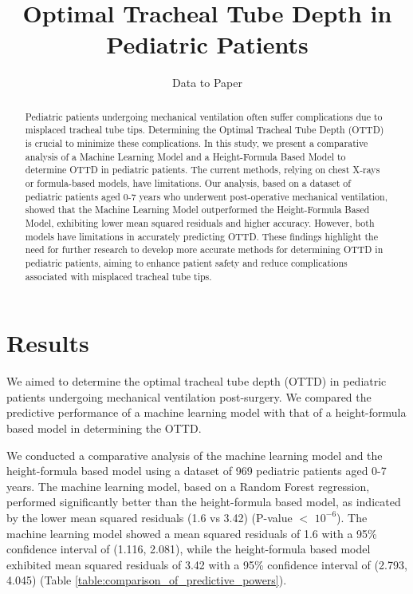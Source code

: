 \documentclass[11pt]{article}
\title{Optimal Tracheal Tube Depth in Pediatric Patients}
\author{Data to Paper}
\begin{document}
\maketitle
\begin{abstract}
Pediatric patients undergoing mechanical ventilation often suffer complications due to misplaced tracheal tube tips. Determining the Optimal Tracheal Tube Depth (OTTD) is crucial to minimize these complications. In this study, we present a comparative analysis of a Machine Learning Model and a Height-Formula Based Model to determine OTTD in pediatric patients. The current methods, relying on chest X-rays or formula-based models, have limitations. Our analysis, based on a dataset of pediatric patients aged 0-7 years who underwent post-operative mechanical ventilation, showed that the Machine Learning Model outperformed the Height-Formula Based Model, exhibiting lower mean squared residuals and higher accuracy. However, both models have limitations in accurately predicting OTTD. These findings highlight the need for further research to develop more accurate methods for determining OTTD in pediatric patients, aiming to enhance patient safety and reduce complications associated with misplaced tracheal tube tips.
\end{abstract}
\section*{Results}

We aimed to determine the optimal tracheal tube depth (OTTD) in pediatric patients undergoing mechanical ventilation post-surgery. We compared the predictive performance of a machine learning model with that of a height-formula based model in determining the OTTD.  

We conducted a comparative analysis of the machine learning model and the height-formula based model using a dataset of 969 pediatric patients aged 0-7 years. The machine learning model, based on a Random Forest regression, performed significantly better than the height-formula based model, as indicated by the lower mean squared residuals (1.6 vs 3.42) (P-value $<$ $10^{-6}$). The machine learning model showed a mean squared residuals of 1.6 with a 95\% confidence interval of (1.116, 2.081), while the height-formula based model exhibited mean squared residuals of 3.42 with a 95\% confidence interval of (2.793, 4.045) (Table \ref{table:comparison_of_predictive_powers}).
\end{document}
